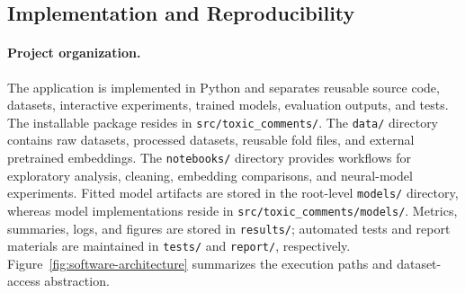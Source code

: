 
\subsection{Implementation and Reproducibility}
\label{sec:implementation}

\paragraph{Project organization.}
The application is implemented in Python and separates reusable source code, datasets, interactive experiments, trained models, evaluation outputs, and tests. The installable package resides in \texttt{src/toxic\_comments/}. The \texttt{data/} directory contains raw datasets, processed datasets, reusable fold files, and external pretrained embeddings. The \texttt{notebooks/} directory provides workflows for exploratory analysis, cleaning, embedding comparisons, and neural-model experiments. Fitted model artifacts are stored in the root-level \texttt{models/} directory, whereas model implementations reside in \texttt{src/toxic\_comments/models/}. Metrics, summaries, logs, and figures are stored in \texttt{results/}; automated tests and report materials are maintained in \texttt{tests/} and \texttt{report/}, respectively. Figure~\ref{fig:software-architecture} summarizes the execution paths and dataset-access abstraction.

